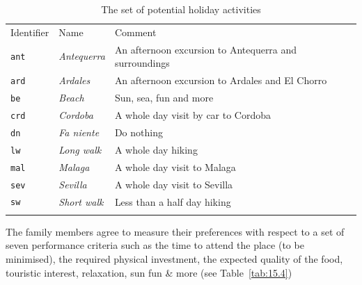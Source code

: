 \begin{table}[ht]
\caption{The set of potential holiday activities}
\label{tab:15.3}       %
\begin{center}
\begin{small}
    \begin{tabular}{l l l}
      \svhline\noalign{\smallskip}
      Identifier & Name & Comment \\
      \noalign{\smallskip}\hline\noalign{\smallskip}
      \texttt{ant }  & \emph{Antequerra}  & An afternoon excursion to Antequerra and surroundings\\
      \texttt{ard}  & \emph{Ardales}  & An afternoon excursion to Ardales and El Chorro\\
      \texttt{be}   & \emph{Beach}  &  Sun, sea, fun and more\\
      \texttt{crd}  & \emph{Cordoba}  &  A whole day visit by car to Cordoba\\
      \texttt{dn}   & \emph{Fa niente}   &  Do nothing\\
      \texttt{lw}   & \emph{Long walk}   &  A whole day hiking\\
      \texttt{mal}  & \emph{Malaga}   &  A whole day visit to Malaga\\
      \texttt{sev}  & \emph{Sevilla}   &  A whole day visit to Sevilla\\
      \texttt{sw}   & \emph{Short walk} &  Less than a half day hiking\\
      \noalign{\smallskip}\hline
    \end{tabular}
\end{small}
\end{center}
\end{table}

The family members agree to measure their preferences with respect to a set of seven performance criteria such as the time to attend the place (to be minimised), the required physical investment, the expected quality of the food, touristic interest, relaxation, sun fun \& more (see Table~\vref{tab:15.4})

